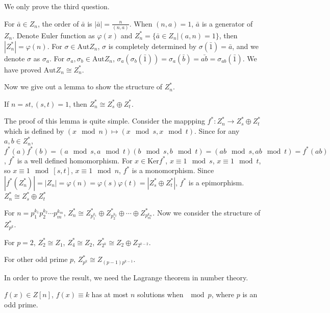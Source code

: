 \begin{answer}
    We only prove the third question.

    For $\bar{a}\in Z_{n}$, the order of $\bar{a}$ is $\left| \bar{a} \right|=\frac{n}{(n,a)}$. When $(n,a)=1$, $\bar{a}$ is a generator of $Z_{n}$. Denote Euler function as $\varphi(x)$ and $Z_{n}^{*}=\{\bar{a}\in Z_{n}|(a,n)=1\}$, then $\left| Z_{n}^{*} \right| =\varphi(n)$. For $\sigma \in \mathrm{Aut}Z_{n}$, $\sigma$ is completely determined by $\sigma(\bar{1})=\bar{a}$, and we denote $\sigma$ as $\sigma_{a}$. For $\sigma_{a},\sigma_{b}\in \mathrm{Aut}Z_{n}$, $\sigma_{a}(\sigma_{b}(\bar{1}))=\sigma_{a}(\bar{b})=\bar{ab}=\sigma_{ab}(\bar{1})$. We have proved $\mathrm{Aut}Z_{n}\cong Z_{n}^{*}$.

    Now we give out a lemma to show the structure of $Z_{n}^{*}$.
    \begin{lemma}
        If $n=st, (s,t)=1$, then $Z_{n}^{*}\cong Z_{s}^{*}\oplus Z_{t}^{*}$.
    \end{lemma}
    The proof of this lemma is quite simple. Consider the mappping $f^{*}: Z_{n}^{*}\to Z_{s}^{*}\oplus Z_{t}^{*}$ which is defined by $(x \mod n)\mapsto (x\mod s, x\mod t)$. Since for any $a,b\in Z_{n}^{*}$, $f^{*}(a)f^*(b)=(a\mod s,a\mod t)(b\mod s,b\mod t)=(ab\mod s,ab\mod t)=f^{*}(ab)$, $f^{*}$ is a well defined homomorphism. For $x\in \mathrm{Ker}f^{*}$, $x\equiv 1\mod s$, $x\equiv 1\mod t$, so $x\equiv 1\mod \left[s,t\right]$, $x\equiv 1\mod n$, $f^{*}$ is a monomorphism. Since $\left| f^{*}(Z_{n}^{*}) \right|=\left| Z_{n} \right| =\varphi(n)=\varphi(s)\varphi(t)=\left| Z_{s}^{*}\oplus Z_{t}^{*} \right|$, $f^{*}$ is a epimorphism. $Z_{n}^{*}\cong Z_{s}^{*}\oplus Z_{t}^{*}$ 

    For $n=p_{1}^{k_{1}}p_{2}^{k_{2}}\cdots p_{m}^{k_{m}}$, $Z_{n}^{*}\cong Z_{p_{1}^{k_{1}}}^{*}\oplus Z_{p_{2}^{k_{2}}}^{*}\oplus\cdots\oplus Z_{p_{m}^{k_{m}}}^{*}$. Now we consider the structure of $Z_{p^{k}}^{*}$. 

    For $p=2$, $Z_{2}^{*}\cong Z_{1}$, $Z_{4}^{*}\cong Z_{2}$, $Z_{2^{k}}^{*}\cong Z_{2}\oplus Z_{2^{k-2}}$.

    For other odd prime $p$, $Z_{p^{k}}^{*}\cong Z_{(p-1)p^{k-1}}$.

    In order to prove the result, we need the Lagrange theorem in number theory.

    \begin{lemma}[Lagrange]
        $f(x)\in Z\left[n\right]$, $f(x)\equiv k$ has at most $n$ solutions when $\mod p$, where $p$ is an odd prime.
    \end{lemma}


\end{answer}
